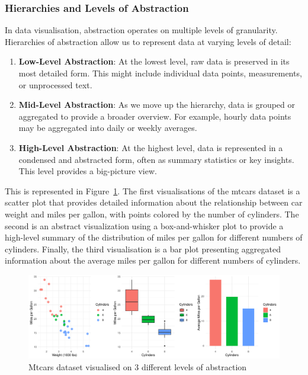 \documentclass{article}\usepackage[]{graphicx}\usepackage[]{xcolor}
\makeatletter
\def\maxwidth{ %
  \ifdim\Gin@nat@width>\linewidth
    \linewidth
  \else
    \Gin@nat@width
  \fi
}
\newenvironment{knitrout}{}{} %
\makeatother
\begin{document}
\subsubsection{Hierarchies and Levels of Abstraction}
In data visualisation, abstraction operates on multiple levels of granularity. Hierarchies of abstraction allow us to represent data at varying levels of detail: 
\begin{enumerate}
    \item \textbf{Low-Level Abstraction}: At the lowest level, raw data is preserved in its most detailed form. This might include individual data points, measurements, or unprocessed text.
    \item \textbf{Mid-Level Abstraction}: As we move up the hierarchy, data is grouped or aggregated to provide a broader overview. For example, hourly data points may be aggregated into daily or weekly averages.
    \item \textbf{High-Level Abstraction}: At the highest level, data is represented in a condensed and abstracted form, often as summary statistics or key insights. This level provides a big-picture view.
\end{enumerate}

This is represented in Figure~\ref{fig:abs-plots}. The first visualisations of the mtcars dataset is a scatter plot that provides detailed information about the relationship between car weight and miles per gallon, with points colored by the number of cylinders. The second is an abstract visualization using a box-and-whisker plot to provide a high-level summary of the distribution of miles per gallon for different numbers of cylinders. Finally, the third visualisation is a bar plot presenting aggregated information about the average miles per gallon for different numbers of cylinders.

\begin{knitrout}\scriptsize
{}\color{fgcolor}\begin{figure}[H]

{\centering \includegraphics[width=\maxwidth]{figure/beamer-abs-plots-1} 

}

\caption[Mtcars dataset visualised on 3 different levels of abstraction]{Mtcars dataset visualised on 3 different levels of abstraction}\label{fig:abs-plots}
\end{figure}

\end{knitrout}
\end{document}
